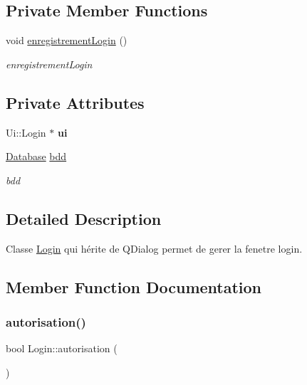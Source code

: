 \subsection*{Private Member Functions}
\begin{DoxyCompactItemize}
\item 
\mbox{\label{class_login_a27cf76c5ec316c5ffe6df19817c578f6}} 
void \mbox{\hyperlink{class_login_a27cf76c5ec316c5ffe6df19817c578f6}{enregistrement\+Login}} ()
\begin{DoxyCompactList}\small\item\em enregistrement\+Login \end{DoxyCompactList}\end{DoxyCompactItemize}
\subsection*{Private Attributes}
\begin{DoxyCompactItemize}
\item 
\mbox{\label{class_login_a55fa3b19085f864462451d3dd9efd2e1}} 
Ui\+::\+Login $\ast$ {\bfseries ui}
\item 
\mbox{\label{class_login_a1966b62cfe44e948028a67e615197c63}} 
\mbox{\hyperlink{class_database}{Database}} \mbox{\hyperlink{class_login_a1966b62cfe44e948028a67e615197c63}{bdd}}
\begin{DoxyCompactList}\small\item\em bdd \end{DoxyCompactList}\end{DoxyCompactItemize}


\subsection{Detailed Description}
Classe \mbox{\hyperlink{class_login}{Login}} qui hérite de Q\+Dialog permet de gerer la fenetre login. 

\subsection{Member Function Documentation}
\mbox{\label{class_login_ab6e2f801e7106b79425ae7c84bc8cd09}} 
\subsubsection{\texorpdfstring{autorisation()}{autorisation()}}
{\footnotesize\ttfamily bool Login\+::autorisation (\begin{DoxyParamCaption}{ }\end{DoxyParamCaption})}



